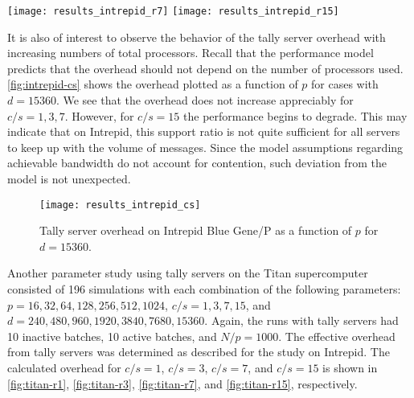 \documentclass[3p]{elsarticle}
\begin{document}
\begin{figure*}[!th]
  \begin{floatrow}
     {\texttt{[image: results\_intrepid\_r7]}}
     {\texttt{[image: results\_intrepid\_r15]}}
  \end{floatrow}
\end{figure*}

It is also of interest to observe the behavior of the tally server overhead with
increasing numbers of total processors. Recall that the performance model
predicts that the overhead should not depend on the number of processors
used. \autoref{fig:intrepid-cs} shows the overhead plotted as a function of $p$
for cases with $d = 15360$. We see that the overhead does not increase
appreciably for $c/s = 1, 3, 7$. However, for $c/s = 15$ the performance begins
to degrade. This may indicate that on Intrepid, this support ratio is not quite
sufficient for all servers to keep up with the volume of messages. Since the
model assumptions regarding achievable bandwidth do not account for contention,
such deviation from the model is not unexpected.

\begin{figure}[!tbh]
  \centering
  \texttt{[image: results\_intrepid\_cs]}
  \caption{Tally server overhead on Intrepid Blue Gene/P as a function of $p$
    for $d = 15360$.}
  \label{fig:intrepid-cs}
\end{figure}

Another parameter study using tally servers on the Titan supercomputer consisted
of 196 simulations with each combination of the following parameters: $p =
16,32,64,128,256,512,1024$, $c/s = 1,3,7,15$, and $d = 240, 480, 960, 1920,
3840, 7680, 15360$. Again, the runs with tally servers had 10 inactive batches,
10 active batches, and $N/p = 1000$. The effective overhead from tally servers
was determined as described for the study on Intrepid. The calculated overhead
for $c/s = 1$, $c/s = 3$, $c/s = 7$, and $c/s = 15$ is shown in
\autoref{fig:titan-r1}, \autoref{fig:titan-r3}, \autoref{fig:titan-r7}, and
\autoref{fig:titan-r15}, respectively.
\end{document}
